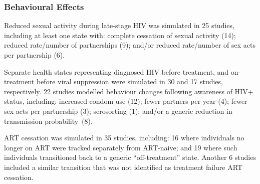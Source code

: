 \subsubsection{Behavioural Effects}\label{sr.res.f.behav}
Reduced sexual activity during late-stage HIV was simulated in 25 studies,
including at least one state with:
complete cessation of sexual activity (14);
reduced rate/number of partnerships (9); and/or
reduced rate/number of sex acts per partnership (6).
\par
Separate health states representing diagnosed HIV before treatment,
and on-treatment before viral suppression were simulated in
30 and 17 studies, respectively.
22 studies modelled behaviour changes following awareness of HIV+ status, including:
increased condom use (12);
fewer partners per year (4);
fewer sex acts per partnership (3);
serosorting (1); and/or
a generic reduction in transmission probability~(8).
\par
ART cessation was simulated in 35 studies, including:
16 where individuals no longer on ART were tracked separately from ART-naive; and
19 where such individuals transitioned back to a generic ``off-treatment'' state.
Another 6 studies included a similar transition
that was not identified as treatment failure \vs ART cessation.
